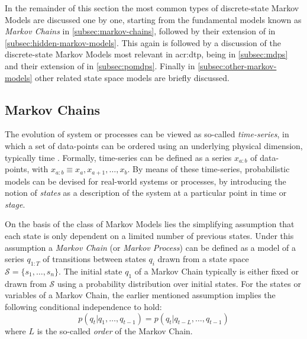 In the remainder of this section the most common types of discrete-state Markov Models are discussed one by one, starting from the fundamental models known as \textit{Markov Chains} in \autoref{subsec:markov-chains}, followed by their extension of \textit{} in \autoref{subsec:hidden-markov-models}.
This again is followed by a discussion of the discrete-state Markov Models most relevant in \acrshort{acr:dtp}, being \textit{} in \autoref{subsec:mdps} and their extension of \textit{} in \autoref{subsec:pomdps}.
Finally in \autoref{subsec:other-markov-models} other related state space models are briefly discussed.

\subsection{Markov Chains}
\label{subsec:markov-chains}

The evolution of system or processes can be viewed as so-called \textit{time-series}, in which a set of data-points can be ordered using an underlying physical dimension, typically time \cite{barberBRML2012}.
Formally, time-series can be defined as a series $x_{a:b}$ of data-points, with $x_{a:b} \equiv x_a, x_{a+1}, \ldots, x_b$.
By means of these time-series, probabilistic models can be devised for real-world systems or processes, by introducing the notion of \textit{states} as a description of the system at a particular point in time or \textit{stage}.

On the basis of the class of Markov Models lies the simplifying assumption that each state is only dependent on a limited number of previous states.
Under this assumption a \textit{Markov Chain} (or \textit{Markov Process}) can be defined as a model of a series $q_{1:T}$ of transitions between states $q_i$ drawn from a state space $\mathcal{S} = \{s_1,\ldots,s_n\}$. The initial state $q_1$ of a Markov Chain typically is either fixed or drawn from $\mathcal{S}$ using a probability distribution over initial states.
For the states or variables of a Markov Chain, the earlier mentioned assumption implies the following conditional independence to hold:
\begin{equation}
	p(q_t \vert q_1,\ldots,q_{t-1}) = p(q_t \vert q_{t - L}, \ldots, q_{t-1})
\end{equation}
where $L$ is the so-called \textit{order} of the Markov Chain.

